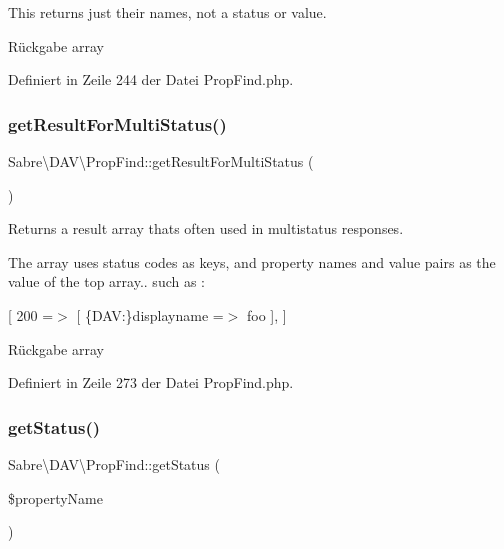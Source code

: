 This returns just their names, not a status or value.

\begin{DoxyReturn}{Rückgabe}
array 
\end{DoxyReturn}


Definiert in Zeile 244 der Datei Prop\+Find.\+php.

\mbox{\label{class_sabre_1_1_d_a_v_1_1_prop_find_a154a7ef5fb583a1ecdc6f52bc7fd4290}} 
\subsubsection{\texorpdfstring{get\+Result\+For\+Multi\+Status()}{getResultForMultiStatus()}}
{\footnotesize\ttfamily Sabre\textbackslash{}\+D\+A\+V\textbackslash{}\+Prop\+Find\+::get\+Result\+For\+Multi\+Status (\begin{DoxyParamCaption}{ }\end{DoxyParamCaption})}

Returns a result array that\textquotesingle{}s often used in multistatus responses.

The array uses status codes as keys, and property names and value pairs as the value of the top array.. such as \+:

\mbox{[} 200 =$>$ \mbox{[} \textquotesingle{}\{D\+AV\+:\}displayname\textquotesingle{} =$>$ \textquotesingle{}foo\textquotesingle{} \mbox{]}, \mbox{]}

\begin{DoxyReturn}{Rückgabe}
array 
\end{DoxyReturn}


Definiert in Zeile 273 der Datei Prop\+Find.\+php.

\mbox{\label{class_sabre_1_1_d_a_v_1_1_prop_find_aa2929597232fb32b047faf4cb7cce979}} 
\subsubsection{\texorpdfstring{get\+Status()}{getStatus()}}
{\footnotesize\ttfamily Sabre\textbackslash{}\+D\+A\+V\textbackslash{}\+Prop\+Find\+::get\+Status (\begin{DoxyParamCaption}\item[{}]{\$property\+Name }\end{DoxyParamCaption})}

